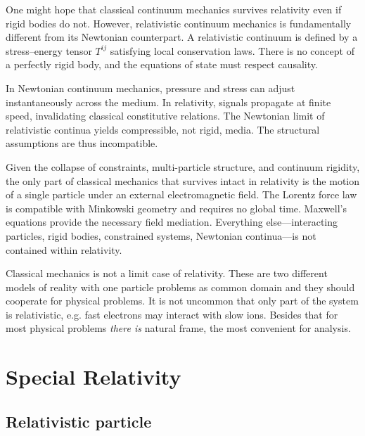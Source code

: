 One might hope that classical continuum mechanics survives relativity 
even if rigid bodies do not. However, relativistic continuum mechanics 
is fundamentally different from its Newtonian counterpart. 
A relativistic continuum is defined by a stress--energy tensor $T^{ij}$ 
satisfying local conservation laws. There is no concept of a 
perfectly rigid body, and the equations of state must respect causality.

In Newtonian continuum mechanics, pressure and stress can adjust 
instantaneously across the medium. In relativity, signals propagate 
at finite speed, invalidating classical constitutive relations. 
The Newtonian limit of relativistic continua yields compressible, 
not rigid, media. The structural assumptions are thus incompatible.

Given the collapse of constraints, multi-particle structure, 
and continuum rigidity, the only part of classical mechanics 
that survives intact in relativity is the motion of a single 
particle under an external electromagnetic field. 
The Lorentz force law is compatible with Minkowski geometry and 
requires no global time. Maxwell's equations provide the necessary field mediation.
Everything else---interacting particles, rigid bodies, 
constrained systems, Newtonian continua---is not contained within relativity.

Classical mechanics is not a limit case of relativity. 
These are two different models of reality with one particle
problems as common domain and they should cooperate for
physical problems. It is not uncommon that only part of
the system is relativistic, e.g. fast electrons may
interact with slow ions. Besides that for most physical
problems {\em there is} natural frame, the most convenient
for analysis.

\section{Special Relativity}
\label{special-relativity}

\subsection{Relativistic particle}
\label {relativistic-particle}

